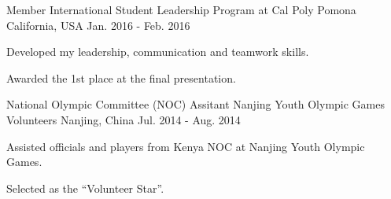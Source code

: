 

\begin{cventries}

  \cventry
    {Member} %
    {International Student Leadership Program at Cal Poly Pomona} %
    {California, USA} %
    {Jan. 2016 - Feb. 2016} %
    {
      \begin{cvitems} %
        \item {Developed my leadership, communication and teamwork skills.}
        \item {Awarded the 1st place at the final presentation.}
      \end{cvitems}
    }

  \cventry
    {National Olympic Committee (NOC) Assitant} %
    {Nanjing Youth Olympic Games Volunteers} %
    {Nanjing, China} %
    {Jul. 2014 - Aug. 2014} %
    {
      \begin{cvitems} %
        \item {Assisted officials and players from Kenya NOC at Nanjing Youth Olympic Games.}
        \item {Selected as the ``Volunteer Star''.}
      \end{cvitems}
    }

    
\end{cventries}
